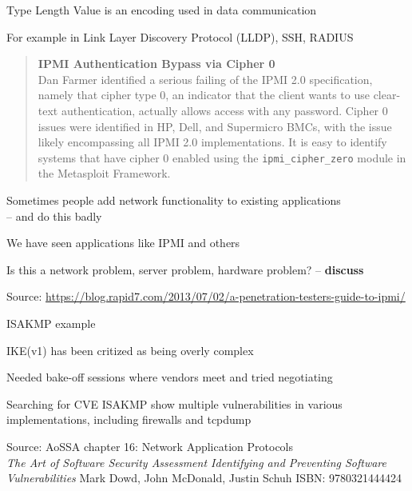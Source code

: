 \documentclass[Screen16to9,17pt]{foils}
\begin{document}
\begin{list2}
\item Type Length Value is an encoding used in data communication
\item For example in Link Layer Discovery Protocol (LLDP), SSH, RADIUS
\end{list2}




\begin{quote}{\bf
  IPMI Authentication Bypass via Cipher 0}\\
  Dan Farmer identified a serious failing of the IPMI 2.0 specification, namely that cipher type 0, an indicator that the client wants to use clear-text authentication, actually allows access with any password. Cipher 0 issues were identified in HP, Dell, and Supermicro BMCs, with the issue likely encompassing all IPMI 2.0 implementations. It is easy to identify systems that have cipher 0 enabled using the \verb+ipmi_cipher_zero+ module in the Metasploit Framework.
\end{quote}

\begin{list2}
\item Sometimes people add network functionality to existing applications\\
-- and do this badly
\item We have seen applications like IPMI and others
\item Is this a network problem, server problem, hardware problem? -- {\bf discuss}
\end{list2}

Source: \url{https://blog.rapid7.com/2013/07/02/a-penetration-testers-guide-to-ipmi/}


\begin{list2}
\item ISAKMP example
\item IKE(v1) has been critized as being overly complex
\item Needed bake-off sessions where vendors meet and tried negotiating
\item Searching for CVE ISAKMP show multiple vulnerabilities in various implementations, including firewalls and tcpdump
\item Source: AoSSA chapter 16: Network Application Protocols\\
\emph{The Art of Software Security Assessment Identifying and Preventing
Software Vulnerabilities}
Mark Dowd, John McDonald, Justin Schuh ISBN: 9780321444424
\end{list2}
\end{document}
